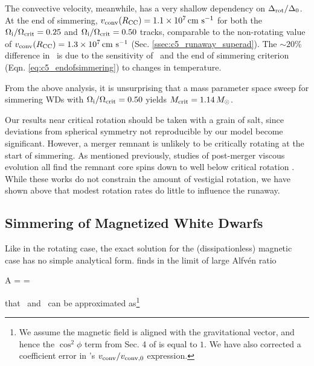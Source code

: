 
The convective velocity, meanwhile, has a very shallow dependency on $\dnabrot/\dnabconvzero$.  At the end of simmering, $\vconvrcc = 1.1\times10^7\,\cmpsec$ for both the $\Ominit/\Omcrit = 0.25$ and $\Ominit/\Omcrit = 0.50$ tracks, comparable to the non-rotating value of $\vconvrcc = 1.3\times10^7\,\cmpsec$ (Sec. \ref{ssec:c5_runaway_superad}).  The $\sim20$\% difference in \vconvrcc\ is due to the sensitivity of \epscc\ and the end of simmering criterion (Eqn. \ref{eq:c5_endofsimmering}) to changes in temperature. 


From the above analysis, it is unsurprising that a mass parameter space sweep for simmering WDs with $\Ominit/\Omcrit = 0.50$ yields $\Mcrit = 1.14\,\Msun$.  


Our results near critical rotation should be taken with a grain of salt, since deviations from spherical symmetry not reproducible by our model become significant. However, a merger remnant is unlikely to be critically rotating at the start of simmering.  As mentioned previously, studies of post-merger viscous evolution all find the remnant core spins down to well below critical rotation \citep{shen+12,schw+12,ji+13}.  While these works do not constrain the amount of vestigial rotation, we have shown above that modest rotation rates do little to influence the runaway.

\subsection{Simmering of Magnetized White Dwarfs}
\label{ssec:c5_runaway_mhd}

Like in the rotating case, the exact solution for the (dissipationless) magnetic case has no simple analytical form.  \citeal{stev79} finds in the limit of large Alfv\'{e}n ratio

\eqbegin
A =  = 
\label{eq:c5_alfven_ratio}
\eqend

\noindent that \dnabmag\ and \vconv\ can be approximated as\footnote{We assume the magnetic field is aligned with the gravitational vector, and hence the $\cos^2\phi$ term from Sec. 4 of \citeal{stev79} is equal to $1$.  We have also corrected a coefficient error in \citeal{stev79}'s $\vconv/\vconvzero$ expression.}

